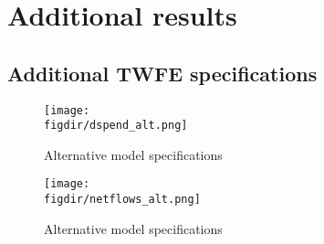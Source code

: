 
\section{Additional results}%
\label{sec:additional_results}



\subsection{Additional TWFE specifications}%
\label{sub:additional_twfe_specifications}

\begin{figure}[H]
    \centering
    \caption{Alternative model specifications}%
    \texttt{[image: \\figdir/dspend\_alt.png]}
\end{figure}




\begin{figure}[H]
    \centering
    \caption{Alternative model specifications}%
    \texttt{[image: \\figdir/netflows\_alt.png]}
\end{figure}









% 


